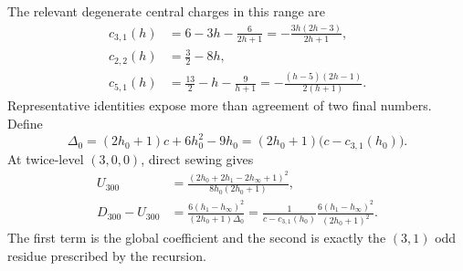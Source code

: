 \documentclass[11pt]{article}
\begin{document}
The relevant degenerate central charges in this range are
\begin{align}
 c_{3,1}(h)&=6-3h-\frac{6}{2h+1}
            =-\frac{3h(2h-3)}{2h+1},\nonumber\\
 c_{2,2}(h)&=\frac32-8h,\nonumber\\
 c_{5,1}(h)&=\frac{13}{2}-h-\frac{9}{h+1}
            =-\frac{(h-5)(2h-1)}{2(h+1)}.
 \label{eq:symbolic-low-order-poles}
\end{align}
Representative identities expose more than agreement of two final
numbers.  Define
\begin{equation}
 \Delta_0=(2h_0+1)c+6h_0^2-9h_0
          =(2h_0+1)\bigl(c-c_{3,1}(h_0)\bigr).
 \label{eq:symbolic-delta-zero}
\end{equation}
At twice-level \((3,0,0)\), direct sewing gives
\begin{align}
 U_{300}
 &=\frac{(2h_0+2h_1-2h_\infty+1)^2}
         {8h_0(2h_0+1)},\nonumber\\
 D_{300}-U_{300}
 &=\frac{6(h_1-h_\infty)^2}{(2h_0+1)\Delta_0}
  =\frac{1}{c-c_{3,1}(h_0)}
    \frac{6(h_1-h_\infty)^2}{(2h_0+1)^2}.
 \label{eq:symbolic-300-check}
\end{align}
The first term is the global coefficient and the second is exactly the
\((3,1)\) odd residue prescribed by the recursion.
\end{document}
